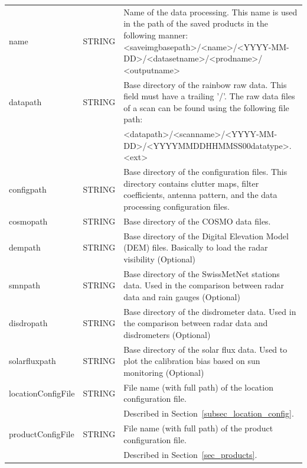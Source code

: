 \documentclass[a4paper,11pt,pdftex,twoside]{scrartcl}
\begin{document}
{{{\begin{longtable}{p{}p{}p{}}
name               & STRING    & Name of the data processing. This name is used
                                 in the path of the saved products in the following manner:
                                 <saveimgbasepath>/<name>/<YYYY-MM-DD>/<datasetname>/<prodname>/
                                 <outputname>\\
datapath           & STRING    & Base directory of the rainbow raw data. This field
                                 must have a trailing '/'. The raw data files of a scan
                                 can be found using the following file path:\\
                   &           & <datapath>/<scanname>/<YYYY-MM-DD>/<YYYYMMDDHHMMSS00datatype>.<ext>\\
configpath         & STRING    & Base directory of the configuration files. This directory
                                 contains clutter maps, filter coefficients, antenna pattern,
                                 and the data processing configuration files.\\
cosmopath          & STRING    & Base directory of the COSMO data files.\\
dempath            & STRING    & Base directory of the Digital Elevation Model (DEM) files.
                                 Basically to load the radar visibility (Optional)\\
smnpath            & STRING    & Base directory of the SwissMetNet stations data. Used in the
                                 comparison between radar data and rain gauges (Optional)\\
disdropath         & STRING    & Base directory of the disdrometer data. Used in the comparison
                                 between radar data and disdrometers (Optional)\\
solarfluxpath      & STRING    & Base directory of the solar flux data. Used to plot the calibration
                                 bias based on sun monitoring (Optional)\\
locationConfigFile & STRING    & File name (with full path) of the location configuration file.\\
                   &           & Described in Section~\ref{subsec_location_config}.\\
productConfigFile  & STRING    & File name (with full path) of the product configuration file.\\
                   &           & Described in Section~\ref{sec_products}.\\

\end{longtable}}}}
\end{document}
